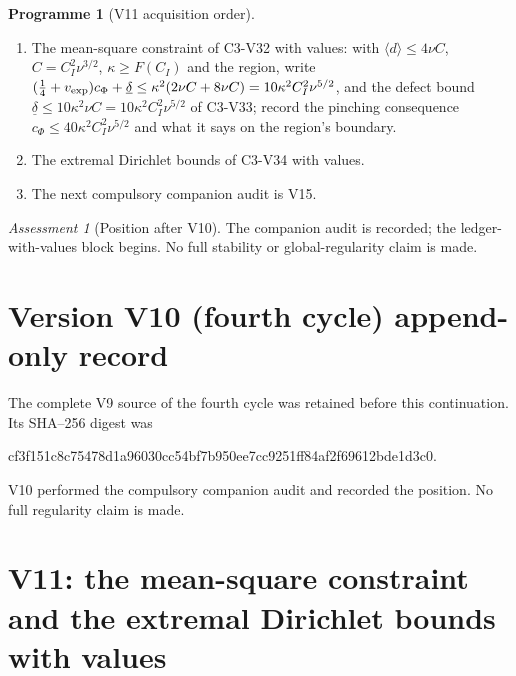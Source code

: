 \documentclass[11pt]{article}
\theoremstyle{plain}
\theoremstyle{definition}
\newtheorem{programme}[theorem]{Programme}
\theoremstyle{remark}
\newtheorem{assessment}[theorem]{Assessment}
\begin{document}
\begin{programme}[V11 acquisition order]
\label{prog:c4v11}
\begin{enumerate}[label=\textup{(AC\arabic*)},leftmargin=4.8em]
\item The mean-square constraint of C3-V32 with values: with
      \(\langle d\rangle\le4\nu C\), \(C=C_I^2\nu^{3/2}\), \(\kappa\ge F(C_I)\) and the region, write
      \((\frac14+v_{\rm exp})c_\Phi+\underline\delta\le\kappa^2(2\nu C+8\nu C)=10\kappa^2C_I^2\nu^{5/2}\), and the defect
      bound \(\underline\delta\le10\kappa^2\nu C=10\kappa^2C_I^2\nu^{5/2}\) of C3-V33; record the pinching
      consequence \(c_\Phi\le40\kappa^2C_I^2\nu^{5/2}\) and what it says on the region's
      boundary.
\item The extremal Dirichlet bounds of C3-V34 with values.
\item The next compulsory companion audit is V15.
\end{enumerate}
\end{programme}

\begin{assessment}[Position after V10]
\label{ass:c4v10-position}
The companion audit is recorded; the ledger-with-values block
begins.  No full stability or global-regularity claim is made.
\end{assessment}

\section*{Version V10 (fourth cycle) append-only record}

The complete V9 source of the fourth cycle was retained before this
continuation.  Its SHA--256 digest was
\begin{center}\scriptsize\ttfamily
cf3f151c8c75478d1a96030cc54bf7b950ee7cc9251ff84af2f69612bde1d3c0.
\end{center}
V10 performed the compulsory companion audit and recorded the
position.  No full regularity claim is made.

\section{V11: the mean-square constraint and the extremal Dirichlet bounds with values}
\label{sec:c4v11-entry}
\end{document}
